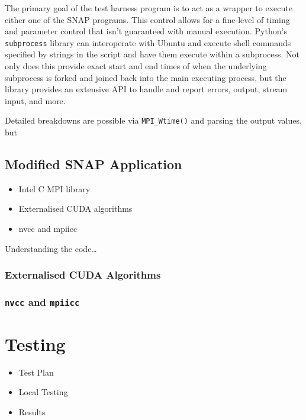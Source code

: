 \documentclass[conference]{IEEEtran}
\begin{document}
The primary goal of the test harness program is to act as a wrapper to execute either one of the SNAP programs. This control allows for a fine-level of timing and parameter control that isn't guaranteed with manual execution. Python's \texttt{subprocess} library can interoperate with Ubuntu and execute shell commands specified by strings in the script and have them execute within a subprocess. Not only does this provide exact start and end times of when the underlying subprocess is forked and joined back into the main executing process, but the library provides an extensive API to handle and report errors, output, stream input, and more.



Detailed breakdowns are possible via \texttt{MPI\_Wtime()} and parsing the output values, but



\subsection{Modified SNAP Application}
\label{subsec:imp_mod_snap}

\begin{itemize}
    \item Intel C MPI library
    \item Externalised CUDA algorithms
    \item nvcc and mpiicc
\end{itemize}

Understanding the code\dots

\subsubsection{Externalised CUDA Algorithms}

\subsubsection{\texttt{nvcc} and \texttt{mpiicc}}


\section{Testing}
\label{sec:testing}

\begin{itemize}
    \item Test Plan
    \item Local Testing
    \item Results
\end{itemize}
\end{document}

